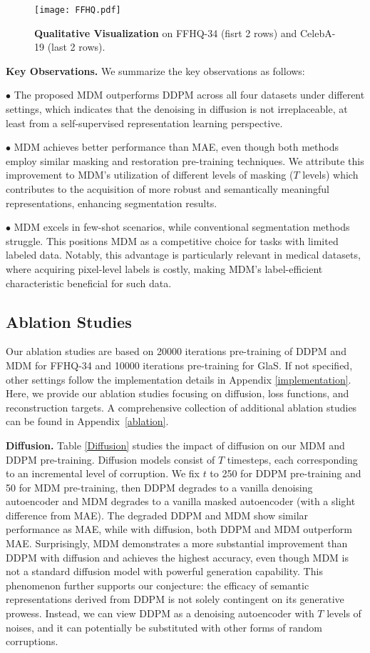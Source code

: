 \documentclass{article} \usepackage{iclr2024_conference,times}
\begin{document}
\begin{figure}[!htp]
\centering
\texttt{[image: FFHQ.pdf]} \caption{\textbf{Qualitative Visualization} on FFHQ-34 (fisrt 2 rows) and CelebA-19 (last 2 rows).}
\label{FFHQ_seg}
\end{figure}


\textbf{Key Observations.} We summarize the key observations as follows:

$\bullet$ The proposed MDM outperforms DDPM across all four datasets under different settings, which indicates that the denoising in diffusion is not irreplaceable, at least from a self-supervised representation learning perspective.

$\bullet$ MDM achieves better performance than MAE, even though both methods employ similar masking and restoration pre-training techniques. We attribute this improvement to MDM's utilization of different levels of masking ($T$ levels) which contributes to the acquisition of more robust and semantically meaningful representations, enhancing segmentation results.

$\bullet$ MDM excels in few-shot scenarios, while conventional segmentation methods struggle. This positions MDM as a competitive choice for tasks with limited labeled data. Notably, this advantage is particularly relevant in medical datasets, where acquiring pixel-level labels is costly, making MDM's label-efficient characteristic beneficial for such data.


\subsection{Ablation Studies}
Our ablation studies are based on 20000 iterations pre-training of DDPM and MDM for FFHQ-34 and 10000 iterations pre-training for GlaS. If not specified, other settings follow the implementation details in Appendix \ref{implementation}. Here, we provide our ablation studies focusing on diffusion, loss functions, and reconstruction targets. A comprehensive collection of additional ablation studies can be found in Appendix~\ref{ablation}.

\textbf{Diffusion.} Table \ref{Diffusion} studies the impact of diffusion on our MDM and DDPM pre-training. Diffusion models consist of $T$ timesteps, each corresponding to an incremental level of corruption. We fix $t$ to 250 for DDPM pre-training and 50 for MDM pre-training, then DDPM degrades to a vanilla denoising autoencoder and MDM degrades to a vanilla masked autoencoder (with a slight difference from MAE). The degraded DDPM and MDM show similar performance as MAE, while with diffusion, both DDPM and MDM outperform MAE. Surprisingly, MDM demonstrates a more substantial improvement than DDPM with diffusion and achieves the highest accuracy, even though MDM is not a standard diffusion model with powerful generation capability. This phenomenon further supports our conjecture: 
the efficacy of semantic representations derived from DDPM is not solely contingent on its generative prowess. Instead, we can view DDPM as a denoising autoencoder with $T$ levels of noises, and it can potentially be substituted with other forms of random corruptions.
\end{document}
